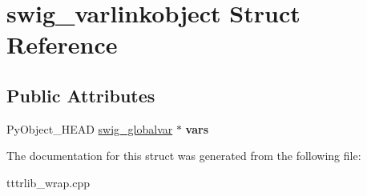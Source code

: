 \hypertarget{structswig__varlinkobject}{}\section{swig\+\_\+varlinkobject Struct Reference}
\label{structswig__varlinkobject}
\subsection*{Public Attributes}
\begin{DoxyCompactItemize}
\item 
\mbox{\label{structswig__varlinkobject_a8cf96d999cdf0b28a0e90ccb6804c9bd}} 
Py\+Object\+\_\+\+H\+E\+AD \hyperlink{structswig__globalvar}{swig\+\_\+globalvar} $\ast$ {\bfseries vars}
\end{DoxyCompactItemize}


The documentation for this struct was generated from the following file\+:\begin{DoxyCompactItemize}
\item 
tttrlib\+\_\+wrap.\+cpp\end{DoxyCompactItemize}
